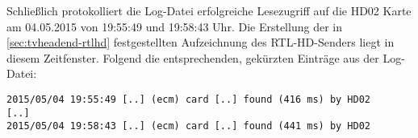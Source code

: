 Schließlich protokolliert die Log-Datei erfolgreiche Lesezugriff auf die HD02 Karte am 04.05.2015 von 19:55:49 und 19:58:43 Uhr. Die Erstellung der in \autoref{sec:tvheadend-rtlhd} festgestellten Aufzeichnung des RTL-HD-Senders liegt in diesem Zeitfenster. Folgend die entsprechenden, gekürzten Einträge aus der Log-Datei:

\begin{verbatim}
2015/05/04 19:55:49 [..] (ecm) card [..] found (416 ms) by HD02
[..]
2015/05/04 19:58:43 [..] (ecm) card [..] found (441 ms) by HD02
\end{verbatim}
